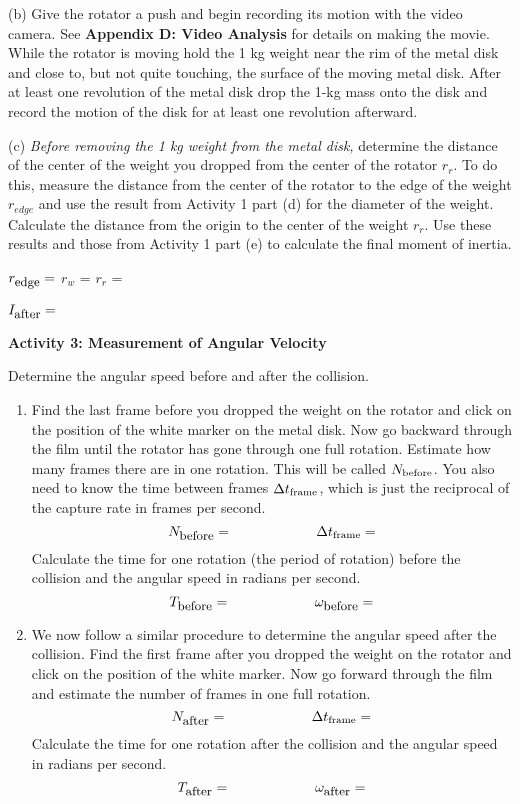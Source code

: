 (b) Give the rotator a push and begin recording its motion with the video camera.
See \textbf{Appendix D: Video Analysis} for details on making the movie. While the rotator is moving
hold the 1 kg weight near the rim of the metal disk and close to, but not quite
touching, the surface of the moving metal disk. After at least one revolution
of the metal disk drop the 1-kg mass onto the disk and record the motion of
the disk for at least one revolution afterward. 

(c) \textit{Before removing the 1 kg weight from the metal disk,} determine the distance of the center of the weight you dropped from the center of the rotator \( r_{r} \). To do this, measure the distance from the center
of the rotator to the edge of the weight \( r_{edge} \) and use the result from Activity 1
part (d) for the diameter of the weight. Calculate the distance from the origin
to the center of the weight \( r_{r} \). Use these results and those from Activity 1 part (e) to calculate the final moment of inertia.
\vspace{5mm}

\( r_{\mbox{\small edge}}  =\) \hfill{}\( r_{w} \) = \hfill{}\( r_{r} \) =\hfill{}
\vspace{5mm}

\( I_{\mbox{\small after}} =\)  
\vspace{5mm}

\textbf{Activity 3: Measurement of Angular Velocity}

Determine the angular speed before and after the collision.

\begin{enumerate}
\item Find the last frame before you dropped the weight on the rotator and click on the position of the white marker on the metal disk. Now go backward through the film until the rotator has gone through one full rotation. Estimate how many frames there are in one rotation. This will be called \( N_{\rm  before}\). You also need to know the time between frames \( \Delta  t_{\rm frame}\), which is just the reciprocal of the capture rate in frames per second.
\[
N_{\mbox{\small before}}=\qquad \qquad \qquad \Delta t_{\rm frame}=\]
Calculate the time for one rotation (the period of rotation) before the collision and the angular speed in radians per second.
\[
T_{\mbox{\small before}}=\qquad \qquad \qquad \omega _{\mbox{\small before}}=\]

\item We now follow a similar procedure to determine the angular speed after the collision. Find the first frame after you dropped the weight on the rotator
and click on the position of the white marker. Now go forward through the film and estimate the number of frames in one full rotation.
\[
N_{\mbox{\small after}}=\qquad \qquad \qquad \Delta t_{\rm frame}=\]
Calculate the time for one rotation after the collision and the angular speed in radians per second.
\[
T_{\mbox{\small after}}=\qquad \qquad \qquad \omega _{\mbox{\small after}}=\]

\end{enumerate}


